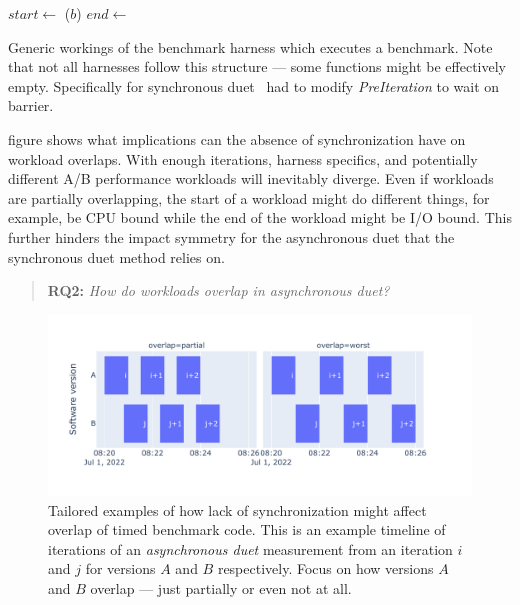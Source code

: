 \begin{algorithm}
\begin{algorithmic}
		\State {}
		 	\State {}
			\State $start \gets$ 
			\State {}($b$)
			\State $end \gets$ 
			\State {}
		\EndFor
		\State {}
		\State {}
	\EndFunction
\end{algorithmic}
\caption{
	Generic workings of the benchmark harness which executes a benchmark.
	Note that not all harnesses follow this structure --- some functions might be effectively empty.
	Specifically for synchronous duet~\citet{bulej2020duet} had to modify \emph{PreIteration} to wait on barrier.
}
\label{alg:harness}
\end{algorithm}

 figure shows what implications can the absence of synchronization have on workload overlaps.
With enough iterations, harness specifics, and potentially different A/B performance workloads will inevitably diverge.
Even if workloads are partially overlapping, the start of a workload might do different things, for example, be CPU bound while the end of the workload might be I/O bound.
This further hinders the impact symmetry for the asynchronous duet that the synchronous duet method relies on.

\begin{quote}
	\textbf{RQ2:} \emph{How do workloads overlap in asynchronous duet?}
\end{quote}

\begin{figure}
	\centering
	\includegraphics[width=.9\linewidth]{./figures/overlap_timeline.pdf}
	\caption{
		Tailored examples of how lack of synchronization might affect overlap of timed benchmark code.
		This is an example timeline of iterations of an \emph{asynchronous duet} measurement from an iteration $i$ and $j$ for versions $A$ and $B$ respectively.
		Focus on how versions $A$ and $B$ overlap --- just partially or even not at all.
	}
	\label{fig:overlap_timeline}
\end{figure}

